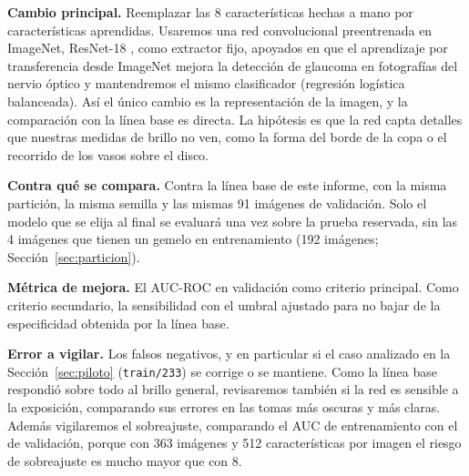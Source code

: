 \documentclass[pdflatex,sn-mathphys-num]{sn-jnl}%
\theoremstyle{thmstyleone}%
\theoremstyle{thmstyletwo}%
\theoremstyle{thmstylethree}%
\begin{document}
\textbf{Cambio principal.} Reemplazar las 8 características hechas a mano por características aprendidas. Usaremos una red convolucional preentrenada en ImageNet, ResNet-18 \cite{he2016resnet}, como extractor fijo, apoyados en que el aprendizaje por transferencia desde ImageNet mejora la detección de glaucoma en fotografías del nervio óptico \cite{christopher2018transfer} y mantendremos el mismo clasificador (regresión logística balanceada). Así el único cambio es la representación de la imagen, y la comparación con la línea base es directa. La hipótesis es que la red capta detalles que nuestras medidas de brillo no ven, como la forma del borde de la copa o el recorrido de los vasos sobre el disco.

\textbf{Contra qué se compara.} Contra la línea base de este informe, con la misma partición, la misma semilla y las mismas 91 imágenes de validación. Solo el modelo que se elija al final se evaluará una vez sobre la prueba reservada, sin las 4 imágenes que tienen un gemelo en entrenamiento (192 imágenes; Sección~\ref{sec:particion}).

\textbf{Métrica de mejora.} El AUC-ROC en validación como criterio principal. Como criterio secundario, la sensibilidad con el umbral ajustado para no bajar de la especificidad obtenida por la línea base.

\textbf{Error a vigilar.} Los falsos negativos, y en particular si el caso analizado en la Sección~\ref{sec:piloto} (\texttt{train/233}) se corrige o se mantiene. Como la línea base respondió sobre todo al brillo general, revisaremos también si la red es sensible a la exposición, comparando sus errores en las tomas más oscuras y más claras. Además vigilaremos el sobreajuste, comparando el AUC de entrenamiento con el de validación, porque con 363 imágenes y 512 características por imagen el riesgo de sobreajuste es mucho mayor que con 8.
\end{document}
